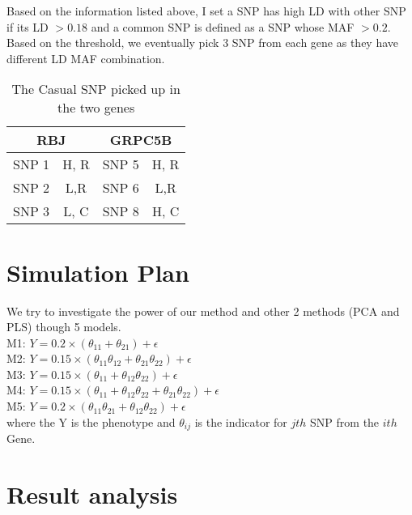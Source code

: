 \documentclass{article}
\begin{document}
    Based on the information listed above, I set a SNP has high LD with other SNP if its LD $>0.18$ and a common SNP is defined as a SNP whose MAF $>0.2$. Based on the threshold, we eventually pick 3 SNP from each gene as they have different LD MAF combination.
        \begin{table}[htbp]
        \centering
        \caption{The Casual SNP picked up in the two genes}
        \begin{tabular}{cc|cc}
            \hline
            \multicolumn{2}{c}{RBJ}&\multicolumn{2}{c}{GRPC5B}\\
            \hline
            SNP 1 & H, R &SNP 5&H, R\\
            SNP 2& L,R&SNP 6&L,R\\
            SNP 3&L, C &SNP 8& H, C \\
            \hline
        \end{tabular}
    \end{table}

    \section{Simulation Plan}

    We try to investigate the power of our method and other 2 methods (PCA and PLS) though 5 models.\\
    M1: $Y=0.2\times(\theta_{11}+\theta_{21})+\epsilon$\\
    M2: $Y=0.15\times(\theta_{11}\theta_{12}+\theta_{21}\theta_{22})+\epsilon$\\
    M3: $Y=0.15\times(\theta_{11}+\theta_{12}\theta_{22})+\epsilon$\\
    M4: $Y=0.15\times(\theta_{11}+\theta_{12}\theta_{22}+\theta_{21}\theta_{22})+\epsilon$\\
    M5: $Y=0.2\times(\theta_{11}\theta_{21}+\theta_{12}\theta_{22})+\epsilon$\\
    where the Y is the phenotype and $\theta_{ij}$ is the indicator for $jth$ SNP from the $ith$ Gene.

    \section{Result analysis}
\end{document}
